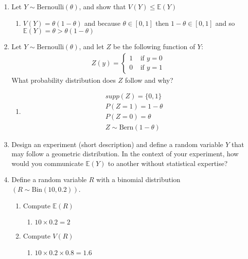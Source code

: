 \documentclass[krantz1,ChapterTOCs]{krantz}
\begin{document}
\begin{enumerate}
    \item Let $Y \sim \text{Bernoulli}(\theta)$, and 
    show that $V(Y) \leq \mathbb{E}(Y)$
    \begin{enumerate}
        \item {\color{red} 
            $V(Y) = \theta (1-\theta)$ and because $\theta \in [0,1]$ then $1-\theta \in [0,1]$ and so $\mathbb{E}(Y) = \theta > \theta (1-\theta)$
        }
    \end{enumerate}
    \item Let $Y \sim \text{Bernoulli}(\theta)$, and let $Z$ be the following function of $Y$:
    \begin{align}
        Z(y) = \begin{cases}
                1 & \text{ if } y = 0\\
                0 & \text{ if } y = 1
            \end{cases}
    \end{align}
    What probability distribution does $Z$ follow and why?
    \begin{enumerate}
        \item {\color{red} 
            \begin{align}
                supp(Z) = \{0,1\} \\ 
                P(Z = 1) = 1 - \theta \\ 
                P(Z =0) = \theta \\
                Z \sim \text{Bern}(1-\theta)
            \end{align}
        }
    \end{enumerate}
    
    
    \item Design an experiment (short description) and define a random variable $Y$ that may follow a geometric distribution. In the context of your experiment, how would you communicate $\mathbb{E}(Y)$ to another without statistical expertise?
    
    \item Define a random variable $R$ with a binomial distribution $(R \sim \text{Bin}(10,0.2))$.
    \begin{enumerate}
        \item Compute $\mathbb{E}(R)$
        \begin{enumerate}
            \item {\color{red} $10 \times 0.2 = 2$  }
        \end{enumerate} 
                
        \item Compute $V(R)$
        \begin{enumerate}
            \item {\color{red}  $10 \times 0.2 \times 0.8 = 1.6$  }
        \end{enumerate} 


\end{enumerate}
\end{enumerate}
\end{document}
